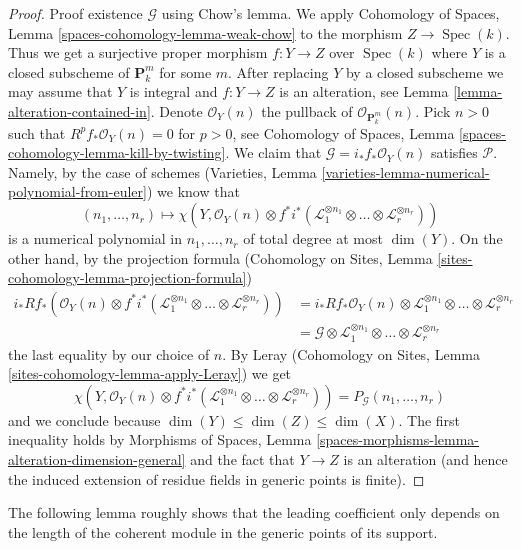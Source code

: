 \documentclass{stacks-project}
\theoremstyle{plain}
\theoremstyle{definition}
\theoremstyle{remark}
\numberwithin{equation}{subsection}
\def\Spec{\mathop{\mathrm{Spec}}}
\begin{document}
\begin{proof}
\medskip\noindent
Proof existence $\mathcal{G}$ using Chow's lemma. We apply
Cohomology of Spaces, Lemma \ref{spaces-cohomology-lemma-weak-chow}
to the morphism $Z \to \Spec(k)$. Thus we get a
surjective proper morphism $f : Y \to Z$ over $\Spec(k)$
where $Y$ is a closed subscheme of $\mathbf{P}^m_k$ for some $m$.
After replacing $Y$ by a closed subscheme we may assume that $Y$
is integral and $f : Y \to Z$ is an alteration, see
Lemma \ref{lemma-alteration-contained-in}.
Denote $\mathcal{O}_Y(n)$ the pullback of $\mathcal{O}_{\mathbf{P}^m_k}(n)$.
Pick $n > 0$ such that $R^pf_*\mathcal{O}_Y(n) = 0$
for $p > 0$, see Cohomology of Spaces, Lemma
\ref{spaces-cohomology-lemma-kill-by-twisting}.
We claim that $\mathcal{G} = i_*f_*\mathcal{O}_Y(n)$ satisfies $\mathcal{P}$.
Namely, by the case of schemes
(Varieties, Lemma \ref{varieties-lemma-numerical-polynomial-from-euler})
we know that
$$
(n_1, \ldots, n_r)
\longmapsto
\chi(Y, \mathcal{O}_Y(n) \otimes
f^*i^*(\mathcal{L}_1^{\otimes n_1} \otimes \ldots \otimes
\mathcal{L}_r^{\otimes n_r}))
$$
is a numerical polynomial in $n_1, \ldots, n_r$ of total degree at
most $\dim(Y)$. On the other hand, by the projection formula
(Cohomology on Sites, Lemma \ref{sites-cohomology-lemma-projection-formula})
\begin{align*}
i_*Rf_*\left(
\mathcal{O}_Y(n) \otimes
f^*i^*(\mathcal{L}_1^{\otimes n_1} \otimes \ldots \otimes
\mathcal{L}_r^{\otimes n_r})\right)
& =
i_*Rf_*\mathcal{O}_Y(n) \otimes
\mathcal{L}_1^{\otimes n_1} \otimes \ldots \otimes
\mathcal{L}_r^{\otimes n_r} \\
& =
\mathcal{G} \otimes \mathcal{L}_1^{\otimes n_1} \otimes \ldots \otimes
\mathcal{L}_r^{\otimes n_r}
\end{align*}
the last equality by our choice of $n$. By
Leray (Cohomology on Sites, Lemma \ref{sites-cohomology-lemma-apply-Leray})
we get
$$
\chi(Y, \mathcal{O}_Y(n) \otimes
f^*i^*(\mathcal{L}_1^{\otimes n_1} \otimes \ldots \otimes
\mathcal{L}_r^{\otimes n_r})) =
P_\mathcal{G}(n_1, \ldots, n_r)
$$
and we conclude because $\dim(Y) \leq \dim(Z) \leq \dim(X)$.
The first inequality holds by
Morphisms of Spaces, Lemma
\ref{spaces-morphisms-lemma-alteration-dimension-general}
and the fact that $Y \to Z$ is an alteration (and hence the
induced extension of residue fields in generic points is finite).
\end{proof}

\noindent
The following lemma roughly shows that the leading coefficient only depends
on the length of the coherent module in the generic points of its
support.
\end{document}
